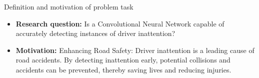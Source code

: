 

\maketitle
\begin{frame}{\huge{Definition and motivation of problem task}}
  \begin{itemize}
    \item \textbf{Research question:} Is a Convolutional Neural Network capable of accurately detecting instances of driver inattention? 
    \item \textbf{Motivation:} Enhancing Road Safety: Driver inattention is a leading cause of road accidents. By detecting inattention early, potential collisions and accidents can be prevented, thereby saving lives and reducing injuries.
  \end{itemize}
\end{frame}
% 
